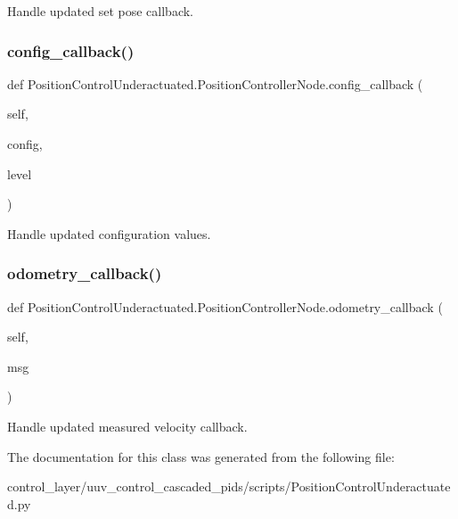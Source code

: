 \begin{DoxyVerb}Handle updated set pose callback.\end{DoxyVerb}
 \mbox{\label{classPositionControlUnderactuated_1_1PositionControllerNode_aae800b3fd982ab0b87a0fbc4f7c543f8}} 
\subsubsection{\texorpdfstring{config\+\_\+callback()}{config\_callback()}}
{\footnotesize\ttfamily def Position\+Control\+Underactuated.\+Position\+Controller\+Node.\+config\+\_\+callback (\begin{DoxyParamCaption}\item[{}]{self,  }\item[{}]{config,  }\item[{}]{level }\end{DoxyParamCaption})}

\begin{DoxyVerb}Handle updated configuration values.\end{DoxyVerb}
 \mbox{\label{classPositionControlUnderactuated_1_1PositionControllerNode_a33466241b66a2b487f2def659093a605}} 
\subsubsection{\texorpdfstring{odometry\+\_\+callback()}{odometry\_callback()}}
{\footnotesize\ttfamily def Position\+Control\+Underactuated.\+Position\+Controller\+Node.\+odometry\+\_\+callback (\begin{DoxyParamCaption}\item[{}]{self,  }\item[{}]{msg }\end{DoxyParamCaption})}

\begin{DoxyVerb}Handle updated measured velocity callback.\end{DoxyVerb}
 

The documentation for this class was generated from the following file\+:\begin{DoxyCompactItemize}
\item 
control\+\_\+layer/uuv\+\_\+control\+\_\+cascaded\+\_\+pids/scripts/Position\+Control\+Underactuated.\+py\end{DoxyCompactItemize}
